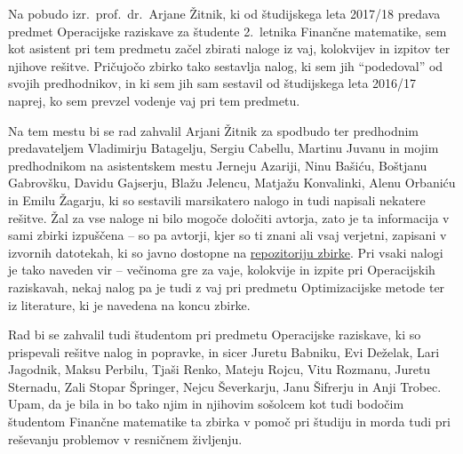 Na pobudo izr.~prof.~dr.~Arjane Žitnik,
ki od študijskega leta 2017/18 predava predmet Operacijske raziskave
za študente 2.~letnika Finančne matematike,
sem kot asistent pri tem predmetu začel zbirati
naloge iz vaj, kolokvijev in izpitov ter njihove rešitve.
Pričujočo zbirko tako sestavlja \thetotal{} nalog,
ki sem jih ``podedoval'' od svojih predhodnikov,
in ki sem jih sam sestavil od študijskega leta 2016/17 naprej,
ko sem prevzel vodenje vaj pri tem predmetu.

Na tem mestu bi se rad zahvalil Arjani Žitnik za spodbudo
ter predhodnim predavateljem Vladimirju Batagelju, Sergiu Cabellu, Martinu Juvanu
in mojim predhodnikom na asistentskem mestu
Jerneju Azariji, Ninu Bašiću, Boštjanu Gabrovšku, Davidu Gajserju,
Blažu Jelencu, Matjažu Konvalinki, Alenu Orbaniću in Emilu Žagarju,
ki so sestavili marsikatero nalogo in tudi napisali nekatere rešitve.
Žal za vse naloge ni bilo mogoče določiti avtorja,
zato je ta informacija v sami zbirki izpuščena
-- so pa avtorji, kjer so ti znani ali vsaj verjetni,
zapisani v izvornih datotekah,
ki so javno dostopne na
\href{https://github.com/jaanos/or-zbirka}{repozitoriju zbirke}.
Pri vsaki nalogi je tako naveden vir
-- večinoma gre za vaje, kolokvije in izpite pri Operacijskih raziskavah,
nekaj nalog pa je tudi z vaj pri predmetu Optimizacijske metode
ter iz literature, ki je navedena na koncu zbirke.

Rad bi se zahvalil tudi študentom pri predmetu Operacijske raziskave,
ki so prispevali rešitve nalog in popravke,
in sicer Juretu Babniku, Evi Deželak, Lari Jagodnik, Maksu Perbilu, Tjaši Renko,
Mateju Rojcu, Vitu Rozmanu, Juretu Sternadu, Zali Stopar Špringer,
Nejcu Ševerkarju, Janu Šifrerju in Anji Trobec.
Upam,
da je bila in bo tako njim in njihovim sošolcem
kot tudi bodočim študentom Finančne matematike
ta zbirka v pomoč pri študiju
in morda tudi pri reševanju problemov v resničnem življenju.
